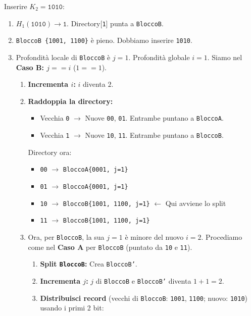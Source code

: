 Inserire $K_2 = \texttt{1010}$:
\begin{enumerate}
    \item $H_1(\texttt{1010}) \rightarrow \texttt{1}$. Directory[\texttt{1}] punta a \texttt{BloccoB}.
    \item \texttt{BloccoB \{1001, 1100\}} è pieno. Dobbiamo inserire \texttt{1010}.
    \item Profondità locale di \texttt{BloccoB} è $j=1$. Profondità globale $i=1$.
    Siamo nel \textbf{Caso B: $j == i$} ($1 == 1$).
    \begin{enumerate}
        \item \textbf{Incrementa $i$:} $i$ diventa $2$.
        \item \textbf{Raddoppia la directory:}
        \begin{itemize}
            \item Vecchia \texttt{0} $\rightarrow$ Nuove \texttt{00}, \texttt{01}. Entrambe puntano a \texttt{BloccoA}.
            \item Vecchia \texttt{1} $\rightarrow$ Nuove \texttt{10}, \texttt{11}. Entrambe puntano a \texttt{BloccoB}.
        \end{itemize}
        Directory ora:
        \begin{itemize}
            \item \texttt{00} $\rightarrow$ \texttt{BloccoA\{0001, j=1\}}
            \item \texttt{01} $\rightarrow$ \texttt{BloccoA\{0001, j=1\}}
            \item \texttt{10} $\rightarrow$ \texttt{BloccoB\{1001, 1100, j=1\}} $\leftarrow$ Qui avviene lo split
            \item \texttt{11} $\rightarrow$ \texttt{BloccoB\{1001, 1100, j=1\}}
        \end{itemize}
        \item Ora, per \texttt{BloccoB}, la sua $j=1$ è minore del nuovo $i=2$. Procediamo come nel \textbf{Caso A} per \texttt{BloccoB} (puntato da \texttt{10} e \texttt{11}).
        \begin{enumerate}
            \item \textbf{Split \texttt{BloccoB}:} Crea \texttt{BloccoB'}.
            \item \textbf{Incrementa $j$:} $j$ di \texttt{BloccoB} e \texttt{BloccoB'} diventa $1+1 = 2$.
            \item \textbf{Distribuisci record} (vecchi di \texttt{BloccoB}: \texttt{1001}, \texttt{1100}; nuovo: \texttt{1010}) usando i primi 2 bit:

\end{enumerate}
\end{enumerate}
\end{enumerate}
